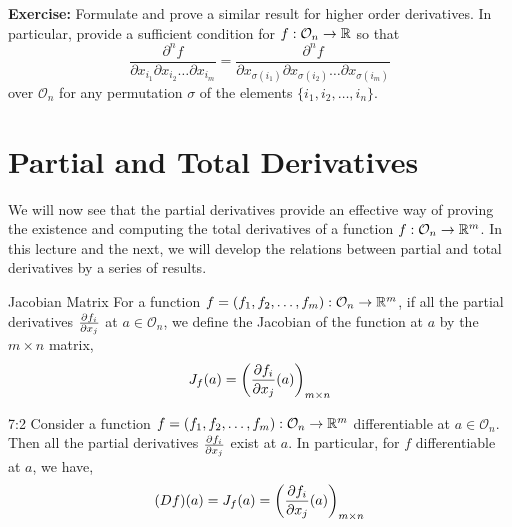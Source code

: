 \documentclass[../Analysis-3.tex]{subfiles}
\begin{document}
\msk

\textbf{Exercise:} Formulate and prove a similar result for higher order derivatives. In particular, provide a sufficient condition for $f: \mathcal{O}_n \to \mathbb{R}$ so that
\[\frac{\partial^n f}{\partial x_{i_1} \partial x_{i_2} \dots \partial x_{i_m}} = \frac{\partial^n f}{\partial x_{\sigma(i_1)} \partial x_{\sigma(i_2)} \dots \partial x_{\sigma(i_m)}}\]
over $\mathcal{O}_n$ for any permutation $\sigma$ of the elements $\{i_1,i_2,\dots,i_n\}$.

\section{Partial and Total Derivatives}

We will now see that the partial derivatives provide an effective way of proving the existence and computing the total derivatives of a function $f: \mathcal{O}_n \to \mathbb{R}^m$. In this lecture and the next, we will develop the relations between partial and total derivatives by a series of results.

\begin{Def}{Jacobian Matrix}{}
  For a function $f = (f_1, f_2, \dots, f_m): \mathcal{O}_n \to \mathbb{R}^m$, if all the partial derivatives $\pdv{f_i}{x_j}$ at $a \in \mathcal{O}_n$, we define the Jacobian of the function at $a$ by the $m \times n$ matrix,
  \[J_f(a) = \left( \pdv{f_i}{x_j}\/(a) \right)_{m \times n}\]
\end{Def}

\begin{Thm}{}{7:2}
  Consider a function $f = (f_1, f_2, \dots, f_m): \mathcal{O}_n \to \mathbb{R}^m$ differentiable at $a \in \mathcal{O}_n$. Then all the partial derivatives $\pdv{f_i}{x_j}$ exist at $a$. In particular, for $f$ differentiable at $a$, we have,
  \[(Df)(a) = J_f(a) = \left( \pdv{f_i}{x_j} \/ (a)\right)_{m \times n}\]
\end{Thm}
\end{document}
